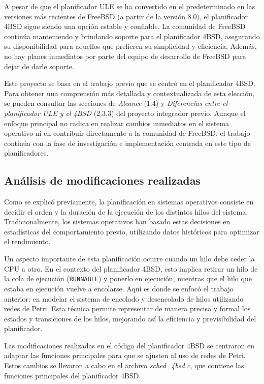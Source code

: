 A pesar de que el planificador ULE se ha convertido en el predeterminado en las versiones más recientes de FreeBSD (a partir de la versión 8.0), el planificador 4BSD sigue siendo una opción estable y confiable. La comunidad de FreeBSD continúa manteniendo y brindando soporte para el planificador 4BSD, asegurando su disponibilidad para aquellos que prefieren su simplicidad y eficiencia. Además, no hay planes inmediatos por parte del equipo de desarrollo de FreeBSD para dejar de darle soporte.\par

Este proyecto se basa en el trabajo previo que se centró en el planificador 4BSD. Para obtener una comprensión más detallada y contextualizada de esta elección, se pueden consultar las secciones de \textit{Alcance} (1.4) y  \textit{Diferencias entre el planificador ULE y el 4BSD} (2.3.3) del proyecto integrador previo\cite{bib1}. Aunque el enfoque principal no radica en realizar cambios inmediatos en el sistema operativo ni en contribuir directamente a la comunidad de FreeBSD, el trabajo continúa con la fase de investigación e implementación centrada en este tipo de planificadores.\par


\subsection{Análisis de modificaciones realizadas}

Como se explicó previamente, la planificación en sistemas operativos consiste en decidir el orden y la duración de la ejecución de los distintos hilos del sistema. Tradicionalmente, los sistemas operativos han basado estas decisiones en estadísticas del comportamiento previo, utilizando datos históricos para optimizar el rendimiento.

Un aspecto importante de esta planificación ocurre cuando un hilo debe ceder la CPU a otro. En el contexto del planificador 4BSD, esto implica retirar un hilo de la cola de ejecución (\texttt{RUNNABLE}) y ponerlo en ejecución, mientras que el hilo que estaba en ejecución vuelve a encolarse. Aquí es donde se enfocó el trabajo anterior: en modelar el sistema de encolado y desencolado de hilos utilizando redes de Petri. Esta técnica permite representar de manera precisa y formal los estados y transiciones de los hilos, mejorando así la eficiencia y previsibilidad del planificador.

Las modificaciones realizadas en el código del planificador 4BSD se centraron en adaptar las funciones principales para que se ajusten al uso de redes de Petri. Estos cambios se llevaron a cabo en el archivo \textit{sched\_4bsd.c}, que contiene las funciones principales del planificador 4BSD.

